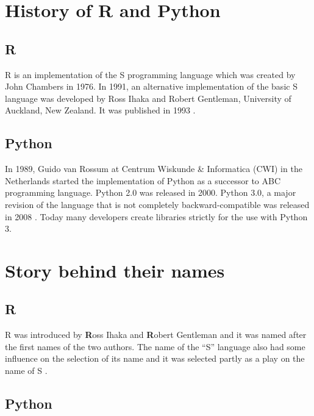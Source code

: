 \documentclass[
]{book}
\begin{document}
\hypertarget{history-of-r-and-python}{%
\section{History of R and Python}\label{history-of-r-and-python}}

\hypertarget{r-1}{%
\subsection{R}\label{r-1}}

R is an implementation of the S programming language which was created by John Chambers in 1976. In 1991, an alternative implementation of the basic S language was developed by Ross Ihaka and Robert Gentleman, University of Auckland, New Zealand. It was published in 1993 \citep{wikiR}.

\hypertarget{python-1}{%
\subsection{Python}\label{python-1}}

In 1989, Guido van Rossum at Centrum Wiskunde \& Informatica (CWI) in the Netherlands started the implementation of Python as a successor to ABC programming language. Python 2.0 was released in 2000. Python 3.0, a major revision of the language that is not completely backward-compatible was released in 2008 \citep{wikipython} . Today many developers create libraries strictly for the use with Python 3.

\hypertarget{story-behind-their-names}{%
\section{Story behind their names}\label{story-behind-their-names}}

\hypertarget{r-2}{%
\subsection{R}\label{r-2}}

R was introduced by \textbf{R}oss Ihaka and \textbf{R}obert Gentleman and it was named after the first names of the two authors. The name of the ``S'' language also had some influence on the selection of its name and it was selected partly as a play on the name of S \citep{wikiR}.

\hypertarget{python-2}{%
\subsection{Python}\label{python-2}}
\end{document}
